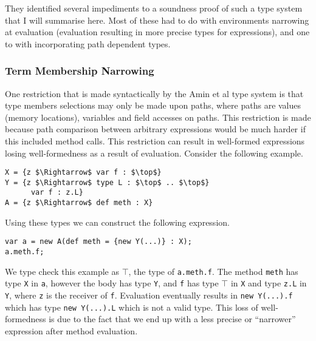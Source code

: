 \documentclass[11pt
              , a4paper
              , twoside
              , openright
              ]{report}
\numberwithin{case}{theorem}
\numberwithin{subcase}{case}
\begin{document}
They identified several impediments to a soundness proof of such a type system that I will summarise here. Most of these had to do with environments narrowing at evaluation (evaluation resulting in more precise types for expressions), and one to with incorporating path dependent types. 

\subsubsection{Term Membership Narrowing}
One restriction that is made syntactically by the Amin et al \cite{amin:fool:2012} type system is that type members selections may only be made upon paths, where paths are values (memory locations), variables and field accesses on paths. This restriction is made because path comparison between arbitrary expressions would be much harder if this included method calls. This restriction can result in well-formed expressions losing well-formedness as a result of evaluation. Consider the following example.
\begin{lstlisting}[mathescape, style=customlang]
X = {z $\Rightarrow$ var f : $\top$}
Y = {z $\Rightarrow$ type L : $\top$ .. $\top$}
	  var f : z.L}
A = {z $\Rightarrow$ def meth : X}
\end{lstlisting}
Using these types we can construct the following expression.
\begin{lstlisting}[mathescape, style=customlang]
var a = new A(def meth = {new Y(...)} : X);
a.meth.f;
\end{lstlisting}
We type check this example as $\top$, the type of \verb|a.meth.f|. The method \verb|meth| has type \verb|X| in \verb|a|, however the body has type \verb|Y|, and \verb|f| has type $\top$ in \verb|X| and type \verb|z.L| in \verb|Y|, where \verb|z| is the receiver of \verb|f|. Evaluation eventually results in \verb|new Y(...).f| which has type \verb|new Y(...).L| which is not a valid type. This loss of well-formedness is due to the fact that we end up with a less precise or ``narrower'' expression after method evaluation.
\end{document}

